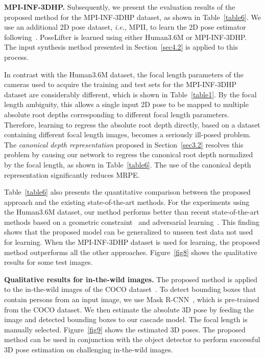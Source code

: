 \documentclass[10pt,twocolumn,letterpaper]{article}
\begin{document}
\textbf{MPI-INF-3DHP.} Subsequently, we present the evaluation results of the proposed method for the MPI-INF-3DHP dataset, as shown in Table~\ref{table6}. We use an additional 2D pose dataset, \textit{i.e.}, MPII, to learn the 2D pose estimator following~\cite{Mehta2017}. PoseLifter is learned using either Human3.6M or MPI-INF-3DHP. The input synthesis method presented in Section~\ref{sec4.2} is applied to this process.

In contrast with the Human3.6M dataset, the focal length parameters of the cameras used to acquire the training and test sets for the MPI-INF-3DHP dataset are considerably different, which is shown in Table~\ref{table1}. By the focal length ambiguity, this allows a single input 2D pose to be mapped to multiple absolute root depths corresponding to different focal length parameters. Therefore, learning to regress the absolute root depth directly, based on a dataset containing different focal length images, becomes a seriously ill-posed problem. The \textit{canonical depth representation} proposed in Section~\ref{sec3.2} resolves this problem by causing our network to regress the canonical root depth normalized by the focal length, as shown in Table~\ref{table6}. The use of the canonical depth representation significantly reduces MRPE.


Table~\ref{table6} also presents the quantitative comparison between the proposed approach and the existing state-of-the-art methods. For the experiments using the Human3.6M dataset, our method performs better than recent state-of-the-art methods based on a geometric constraint~\cite{Zhou2017} and adversarial learning~\cite{Yang2018}. This finding shows that the proposed model can be generalized to unseen test data not used for learning. When the MPI-INF-3DHP dataset is used for learning, the proposed method outperforms all the other approaches. Figure~\ref{fig8} shows the qualitative results for some test images.

\textbf{Qualitative results for in-the-wild images.} The proposed method is applied to the in-the-wild images of the COCO dataset~\cite{Lin2014}. To detect bounding boxes that contain persons from an input image, we use Mask R-CNN~\cite{He2017}, which is pre-trained from the COCO dataset. We then estimate the absolute 3D pose by feeding the image and detected bounding boxes to our cascade model. The focal length is manually selected. Figure~\ref{fig9} shows the estimated 3D poses. The proposed method can be used in conjunction with the object detector to perform successful 3D pose estimation on challenging in-the-wild images.
\end{document}
